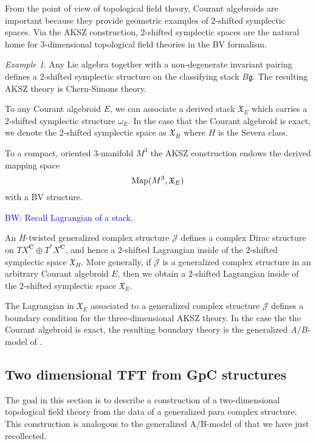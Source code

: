\documentclass{article}
\newcommand{\JJ}{\mathcal{J}}
\newcommand{\Cc}{\mathbf{C}}
\newcommand{\XX}{\mathfrak{X}}
\def\brian{\textcolor{blue}{BW: }\textcolor{blue}}
\theoremstyle{definition}
\theoremstyle{definition}
\theoremstyle{remark}
\newtheorem{Ex}[theorem]{Example}
\begin{document}
\def\fg{\mathfrak{g}}

From the point of view of topological field theory, Courant algebroids are important because they provide geometric examples of $2$-shifted symplectic spaces. 
Via the AKSZ construction, $2$-shifted symplectic spaces are the natural home for $3$-dimensional topological field theories in the BV formalism. 

\begin{Ex}
Any Lie algebra together with a non-degenerate invariant pairing defines a $2$-shifted symplectic structure on the classifying stack $B \fg$. 
The resulting AKSZ theory is Chern-Simons theory. 
\end{Ex}

To any Courant algebroid $E$, we can associate a derived stack $\XX_E$ which carries a $2$-shifted symplectic structure $\omega_E$. 
In the case that the Courant algebroid is exact, we denote the $2$-shifted symplectic space as $\XX_H$ where $H$ is the Severa class. 

To a compact, oriented $3$-manifold $M^3$ the AKSZ construction endows the derived mapping space 
\[
{\rm Map}(M^3 , \XX_E) 
\]
with a BV structure. 

\brian{Recall Lagrangian of a stack.}

An $H$-twisted generalized complex structure $\JJ$ defines a complex Dirac structure on $TX^{\Cc} \oplus T^*X^{\Cc}$, and hence a $2$-shifted Lagrangian inside of the $2$-shifted symplectic space $\XX_H$.  
More generally, if $\JJ$ is a generalized complex structure in an arbitrary Courant algebroid $E$, then we obtain a $2$-shifted Lagrangian inside of the $2$-shifted symplectic space $\XX_E$. 

The Lagrangian in $\XX_E$ associated to a generalized complex structure $\JJ$ defines a boundary condition for the three-dimensional AKSZ theory. 
In the case the the Courant algebroid is exact, the resulting boundary theory is the generalized $A/B$-model of \cite{KapustinLi}.

\subsection{Two dimensional TFT from GpC structures}

The goal in this section is to describe a construction of a two-dimensional topological field theory from the data of a generalized para complex structure. 
This construction is analogous to the generalized A/B-model of \cite{KapustinLi} that we have just recollected. 
\end{document}
